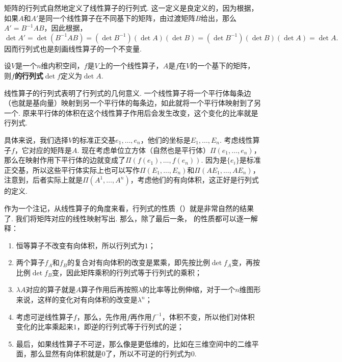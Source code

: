矩阵的行列式自然地定义了线性算子的行列式. 这一定义是良定义的，因为根据，如果$A$和$A'$是同一个线性算子在不同基下的矩阵，由过渡矩阵$B$给出，那么$A'=B^{-1}AB$，因此根据，
\[\det A'=\det(B^{-1}AB)=(\det B^{-1})(\det A)(\det B)=(\det B^{-1})(\det B)(\det A)=\det A.\]
因而行列式也是刻画线性算子的一个不变量. 

\begin{definition}[线性算子的行列式]
设$V$是一个$n$维内积空间，$f$是$V$上的一个线性算子，$A$是$f$在$V$的一个基下的矩阵，则$f$\textbf{的行列式}$\det f$定义为$\det A$.
\end{definition}

线性算子的行列式表明了行列式的几何意义. 一个线性算子将一个平行体每条边（也就是基向量）映射到另一个平行体的每条边，如此就将一个平行体映射到了另一个. 原来平行体的体积在这个线性算子作用后会发生改变，这个变化的比率就是行列式. 

具体来说，我们选择$V$的标准正交基$e_1,\dots,e_n$，他们的坐标是$E_1,\dots,E_n$. 考虑线性算子$f$，它对应的矩阵是$A$. 现在考虑单位立方体（自然也是平行体）$\Pi(e_1,\dots,e_n)$，那么在映射作用下平行体的边就变成了$\Pi(f(e_1),\dots,f(e_n))$. 因为是$\{e_i\}$是标准正交基，所以这些平行体实际上也可以写作$\Pi(E_1,\dots,E_n)$和$\Pi(AE_1,\dots,AE_n)$，注意到，后者实际上就是$\Pi(A^1,\dots, A^n)$，考虑他们的有向体积，这正好是行列式的定义. 

作为一个注记，从线性算子的角度来看，行列式的性质（）就是非常自然的结果了. 我们将矩阵对应的线性映射写出. 那么，除了最后一条， 的性质都可以逐一解释：
\begin{enumerate}
    \item 恒等算子不改变有向体积，所以行列式为$1$；
    \item 两个算子$f_A$和$f_B$的复合对有向体积的改变是累乘，即先按比例$\det f_A$变，再按比例$\det f_B$变，因此矩阵乘积的行列式等于行列式的乘积；
    \item $\lambda A$对应的算子就是$A$算子作用后再按照$\lambda$的比率等比例伸缩，对于一个$n$维图形来说，这样的变化对有向体积的改变是$\lambda^n$；
    \item 考虑可逆线性算子$f$，那么，先作用$f$再作用$f^{-1}$，体积不变，所以他们对体积变化的比率乘起来$1$，即逆的行列式等于行列式的逆；
    \item 最后，如果线性算子不可逆，那么像是更低维的，比如在三维空间中的二维平面，那么显然有向体积就是$0$了，所以不可逆的行列式为$0$.
\end{enumerate}

